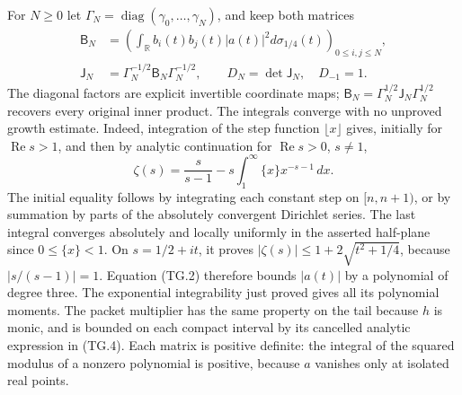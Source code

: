 For \(N\geq0\) let \(\mathsf\Gamma_N=\operatorname{diag}
(\gamma_0,\ldots,\gamma_N)\), and keep both matrices
\[
 \begin{aligned}
 \mathsf B_N&=\left(\int_{\mathbb{R}}
              b_i(t)b_j(t)|a(t)|^2d\sigma_{1/4}(t)\right)_{0\leq i,j\leq N},\\
 \mathsf J_N&=\mathsf\Gamma_N^{-1/2}\mathsf B_N
                       \mathsf\Gamma_N^{-1/2},\qquad
 D_N=\det\mathsf J_N,\quad D_{-1}=1.
 \end{aligned}                                                    \tag{TG.15}
\]
The diagonal factors are explicit invertible coordinate maps;
\(\mathsf B_N=\mathsf\Gamma_N^{1/2}\mathsf J_N
\mathsf\Gamma_N^{1/2}\) recovers every original inner product.
The integrals converge with no unproved growth estimate.  Indeed,
integration of the step function \(\lfloor x\rfloor\) gives,
initially for \(\operatorname{Re}s>1\), and then by analytic
continuation for \(\operatorname{Re}s>0\), \(s\ne1\),
\[
 \zeta(s)=\frac{s}{s-1}
         -s\int_1^\infty\{x\}x^{-s-1}\,dx.
\]
The initial equality follows by integrating each constant step on
\([n,n+1)\), or by summation by parts of the absolutely convergent
Dirichlet series.  The last integral converges absolutely and
locally uniformly in the asserted half-plane since \(0\leq\{x\}<1\).
On \(s=1/2+it\), it proves
\( |\zeta(s)|\leq1+2\sqrt{t^2+1/4}\), because
\(|s/(s-1)|=1\).  Equation (TG.2) therefore bounds \(|a(t)|\)
by a polynomial of degree three.  The exponential integrability
just proved gives all its polynomial moments.  The packet
multiplier has the same property on the tail because \(h\) is
monic, and is bounded on each compact interval by its cancelled
analytic expression in (TG.4).
Each matrix is positive definite:
the integral of the squared modulus of a nonzero polynomial is
positive, because \(a\) vanishes only at isolated real points.

